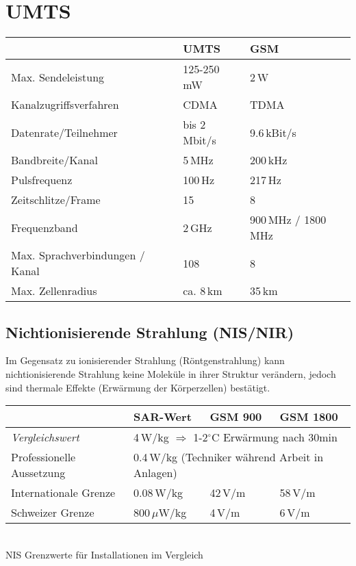 \section{UMTS}
    \begin{tabular}{|l|l|l|}
        \hline
        
        & \textbf{UMTS}
        & \textbf{GSM}\\
        \hline
        Max. Sendeleistung
        & 125-250\,mW
        & 2\,W \\
        \hline
        Kanalzugriffsverfahren
        & CDMA
        & TDMA \\
        \hline
        Datenrate/Teilnehmer
        & bis 2\,Mbit/s 
        & 9.6\,kBit/s \\
        \hline
        Bandbreite/Kanal
        & 5\,MHz
        & 200\,kHz \\
        \hline
        Pulsfrequenz
        & 100\,Hz
        & 217\,Hz \\
        \hline
        Zeitschlitze/Frame
        & 15
        & 8 \\
        \hline
        Frequenzband
        & 2\,GHz
        & 900\,MHz / 1800\,MHz \\
        \hline
        Max. Sprachverbindungen / Kanal
        & 108
        & 8 \\
        \hline
        Max. Zellenradius
        & ca. 8\,km
        & 35\,km \\
        \hline
    \end{tabular}

\subsection{Nichtionisierende Strahlung (NIS/NIR) }
Im Gegensatz zu ionisierender Strahlung (Röntgenstrahlung) kann nichtionisierende Strahlung keine Moleküle 
in ihrer Struktur verändern, jedoch sind thermale Effekte (Erwärmung der Körperzellen) bestätigt.

\begin{center}
\begin{tabular}{|l|l|l|l|} \hline
    & SAR-Wert
    & GSM 900
    & GSM 1800 \\
    \hline    
        \textit{Vergleichswert}
        & \multicolumn{3}{l|}{4\,W/kg $\Rightarrow$ 1-2$^\circ$C Erwärmung nach 30min} \\       
    \hline    
    Professionelle Aussetzung  
        & \multicolumn{3}{l|}{0.4\,W/kg (Techniker während Arbeit in Anlagen)} \\      
    \hline
    Internationale Grenze  
        & 0.08\,W/kg
        & 42\,V/m
        & 58\,V/m \\
    \hline
    Schweizer Grenze 
        & 800\,$\mu$W/kg
        & 4\,V/m
        & 6\,V/m \\
	\hline
	\end{tabular} \\
	NIS Grenzwerte für Installationen im Vergleich
	\end{center}

